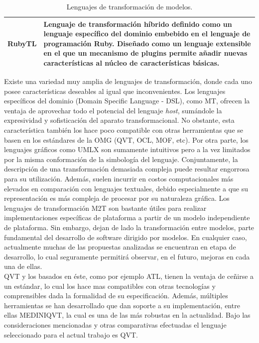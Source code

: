 \begin{table}[!hbt]
\begin{center}
\begin{tabular}{| p{4cm}| p{8cm}|}
\\  
\hline
 RubyTL & Lenguaje de transformación híbrido definido como un lenguaje específico del dominio embebido en el lenguaje de programación Ruby. Diseñado como un lenguaje extensible en el que un mecanismo de plugins permite añadir nuevas características al núcleo de características básicas.\\   

\hline
\end{tabular}
\caption{Lenguajes de transformación de modelos.}
\label{tabla:lenguajesdetransformacion}
\end{center}
\end{table}
\normalsize

Existe una variedad muy amplia de lenguajes de transformación, donde cada uno posee características deseables al igual que inconvenientes. Los lenguajes específicos del dominio (Domain Specific Language - DSL), como MT, ofrecen la ventaja de aprovechar todo el potencial del lenguaje \emph{host}, sumándole la expresividad y sofisticación del aparato transformacional. No obstante, esta característica también los hace poco compatible con otras herramientas que se basen en los estándares de la OMG (QVT, OCL, MOF, etc). Por otra parte, los lenguajes gráficos como UMLX son sumamente intuitivos pero a la vez limitados por la misma conformación de la simbología del lenguaje. Conjuntamente, la descripción de una transformación demasiada compleja puede resultar engorrosa para su utilización. Además, suelen incurrir en costos computacionales más elevados en comparación con lenguajes textuales, debido especialmente a que su representación es más compleja de procesar por su naturaleza gráfica. Los lenguajes de 
transformación M2T son bastante útiles para realizar implementaciones específicas de plataforma a partir de un modelo independiente de plataforma. Sin embargo, dejan de lado la transformación entre modelos, parte fundamental del desarrollo de software dirigido por modelos. En cualquier caso, actualmente muchas de las propuestas analizadas se encuentran en etapa de desarrollo, lo cual seguramente permitirá observar, en el futuro, mejoras en cada una de ellas.\\

QVT y los basados en éste, como por ejemplo ATL, tienen la ventaja de ceñirse a un estándar, lo cual los hace mas compatibles con otras tecnologías y comprensibles dada la formalidad de su especificación. Además, múltiples herramientas se han desarro\-llado que dan soporte a su implementación, entre ellas MEDINIQVT, la cual es una de las más robustas en la actualidad. Bajo las consideraciones mencionadas y otras comparativas efectuadas el lenguaje seleccionado para el actual trabajo es QVT.


